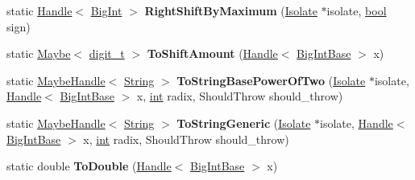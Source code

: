 \begin{DoxyCompactItemize}
\item 
\mbox{\label{classv8_1_1internal_1_1MutableBigInt_ae09da075c5cc942badf85ce2d67eb90d}} 
static \mbox{\hyperlink{classv8_1_1internal_1_1Handle}{Handle}}$<$ \mbox{\hyperlink{classv8_1_1internal_1_1BigInt}{Big\+Int}} $>$ {\bfseries Right\+Shift\+By\+Maximum} (\mbox{\hyperlink{classv8_1_1internal_1_1Isolate}{Isolate}} $\ast$isolate, \mbox{\hyperlink{classbool}{bool}} sign)
\item 
\mbox{\label{classv8_1_1internal_1_1MutableBigInt_a3f8f9508a94eaf3545f11762ff195def}} 
static \mbox{\hyperlink{classv8_1_1Maybe}{Maybe}}$<$ \mbox{\hyperlink{classuintptr__t}{digit\+\_\+t}} $>$ {\bfseries To\+Shift\+Amount} (\mbox{\hyperlink{classv8_1_1internal_1_1Handle}{Handle}}$<$ \mbox{\hyperlink{classv8_1_1internal_1_1BigIntBase}{Big\+Int\+Base}} $>$ x)
\item 
\mbox{\label{classv8_1_1internal_1_1MutableBigInt_aee64bf211486807014a299c956ead0d6}} 
static \mbox{\hyperlink{classv8_1_1internal_1_1MaybeHandle}{Maybe\+Handle}}$<$ \mbox{\hyperlink{classv8_1_1internal_1_1String}{String}} $>$ {\bfseries To\+String\+Base\+Power\+Of\+Two} (\mbox{\hyperlink{classv8_1_1internal_1_1Isolate}{Isolate}} $\ast$isolate, \mbox{\hyperlink{classv8_1_1internal_1_1Handle}{Handle}}$<$ \mbox{\hyperlink{classv8_1_1internal_1_1BigIntBase}{Big\+Int\+Base}} $>$ x, \mbox{\hyperlink{classint}{int}} radix, Should\+Throw should\+\_\+throw)
\item 
\mbox{\label{classv8_1_1internal_1_1MutableBigInt_a5158a6032f29ac3796c3c784a33b9a42}} 
static \mbox{\hyperlink{classv8_1_1internal_1_1MaybeHandle}{Maybe\+Handle}}$<$ \mbox{\hyperlink{classv8_1_1internal_1_1String}{String}} $>$ {\bfseries To\+String\+Generic} (\mbox{\hyperlink{classv8_1_1internal_1_1Isolate}{Isolate}} $\ast$isolate, \mbox{\hyperlink{classv8_1_1internal_1_1Handle}{Handle}}$<$ \mbox{\hyperlink{classv8_1_1internal_1_1BigIntBase}{Big\+Int\+Base}} $>$ x, \mbox{\hyperlink{classint}{int}} radix, Should\+Throw should\+\_\+throw)
\item 
\mbox{\label{classv8_1_1internal_1_1MutableBigInt_a948dde222d4ba5eaf2fd23f839b2f15b}} 
static double {\bfseries To\+Double} (\mbox{\hyperlink{classv8_1_1internal_1_1Handle}{Handle}}$<$ \mbox{\hyperlink{classv8_1_1internal_1_1BigIntBase}{Big\+Int\+Base}} $>$ x)

\end{DoxyCompactItemize}
